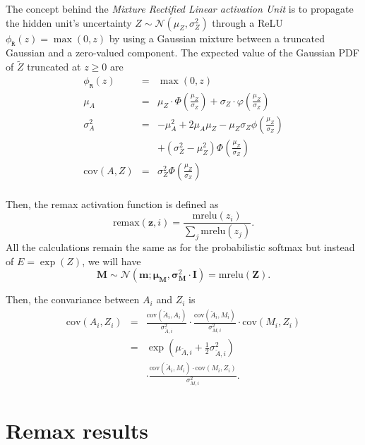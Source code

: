 \documentclass{article}
\begin{document}
The concept behind the \emph{Mixture Rectified Linear activation Unit} is to propagate the hidden unit's uncertainty $Z\sim\mathcal{N}(\mu_Z,\sigma_Z^2)$ through a ReLU $\phi_\mathtt{R}(z)=\max(0,z)$ by using a Gaussian mixture between a truncated Gaussian and a zero-valued component. The expected value of the Gaussian PDF of $\tilde{Z}$ truncated at $z\geq0$ are
\begin{equation}
 \begin{array}{rclll}
 \phi_\mathtt{R}(z)&=&\max(0,z)\\[2pt]

\mu_A &=&\mu_Z\cdot\Phi\left(\frac{\mu_Z}{\sigma_Z}\right)+\sigma_Z \cdot \varphi\left(\frac{\mu_Z}{\sigma_Z}\right)\\[6pt]
\sigma_A^2 &=&   -\mu_A^2 + 2\mu_A\mu_Z  - \mu_Z\sigma_Z \phi\left(\frac{{\mu_Z}}{{\sigma_Z}}\right) \\
 && + \left(\sigma_Z^2-\mu_Z^2\right)\Phi\left(\frac{{\mu_Z }}{{\sigma_Z}}\right)\\[6pt]
  \text{cov}(A,Z)&=& \sigma_Z^2\Phi\left(\frac{\mu_Z}{\sigma_Z}\right) \\[6pt] 
\end{array}
\end{equation}

Then, the remax activation function is defined as
\begin{equation}
\text{remax}(\bm{z},i)=\frac{\text{mrelu}(z_i)}{\sum_j \text{mrelu}(z_j)}.
\end{equation}
All the calculations remain the same as for the probabilistic softmax but instead of $E = \exp(Z)$, we will have $$\bm{M}\sim\mathcal{N}(\bm{m};\bm{\mu}_{\bm{M}},\bm{\sigma}_{\bm{M}}^2\cdot \mathbf{I})=\text{mrelu}(\bm{Z}).$$

Then, the convariance between $A_i$ and $Z_i$ is 
\begin{equation}
\begin{array}{rcl}
\text{cov}(A_i,Z_i)&=&\frac{\text{cov}(\check{A}_i,A_i)}{\sigma_{\check{A},i}^2}\cdot \frac{\text{cov}(\check{A}_i,M_i)}{\sigma^{2}_{M, i}}\cdot\text{cov}(M_i,Z_i)\\[4pt]
&=&\exp(\mu_{\check{A},i}+\tfrac{1}{2}\sigma_{\check{A},i}^2) \\
&& \cdot\frac{\text{cov}(\check{A}_i,M_i) \cdot\text{cov}(M_i,Z_i)}{\sigma^{2}_{M, i}}.\end{array}
\end{equation}

 \section{Remax results}
\end{document}
